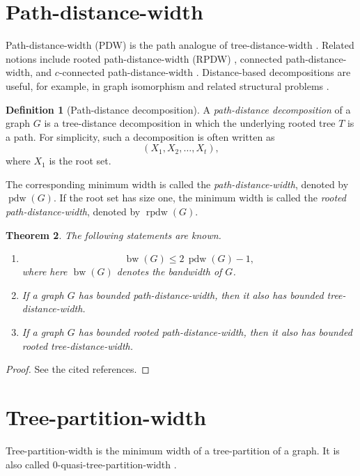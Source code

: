 \documentclass[10pt]{book}
\newtheorem{theorem}{Theorem}[section]
\theoremstyle{definition}
\newtheorem{definition}[theorem]{Definition}
\begin{document}
\section{Path-distance-width}

Path-distance-width (PDW) is the path analogue of tree-distance-width \cite{Althoubi2017AnAO}.  
Related notions include rooted path-distance-width (RPDW) \cite{57}, connected path-distance-width, and \(c\)-connected path-distance-width \cite{309,310}.  
Distance-based decompositions are useful, for example, in graph isomorphism and related structural problems \cite{Read1977TheGI,Grohe2020TheGI,Li2002OnIO}.

\begin{definition}[Path-distance decomposition]
\cite{57}
A \emph{path-distance decomposition} of a graph \(G\) is a tree-distance decomposition in which the underlying rooted tree \(T\) is a path.  
For simplicity, such a decomposition is often written as
\[
(X_1,X_2,\dots,X_t),
\]
where \(X_1\) is the root set.

The corresponding minimum width is called the \emph{path-distance-width}, denoted by \(\operatorname{pdw}(G)\).  
If the root set has size one, the minimum width is called the \emph{rooted path-distance-width}, denoted by \(\operatorname{rpdw}(G)\).
\end{definition}

\begin{theorem}
The following statements are known.
\begin{enumerate}
    \item
    \[
    \operatorname{bw}(G)\leq 2\,\operatorname{pdw}(G)-1,
    \]
    where here \(\operatorname{bw}(G)\) denotes the bandwidth of \(G\).

    \item If a graph \(G\) has bounded path-distance-width, then it also has bounded tree-distance-width.

    \item If a graph \(G\) has bounded rooted path-distance-width, then it also has bounded rooted tree-distance-width.
\end{enumerate}
\end{theorem}

\begin{proof}
See the cited references.
\end{proof}

\section{Tree-partition-width}
Tree-partition-width \cite{58} is the minimum width of a tree-partition of a graph.  
It is also called \(0\)-quasi-tree-partition-width \cite{253}.
\end{document}
